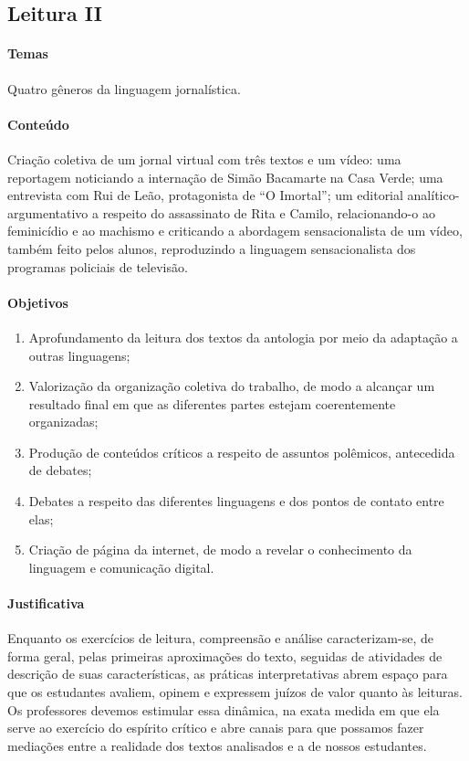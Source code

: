 \documentclass{extarticle}
\begin{document}
\subsection{Leitura II}


\paragraph{Temas} Quatro gêneros da linguagem jornalística.

\paragraph{Conteúdo} Criação coletiva de um jornal virtual com três textos
e um vídeo: uma reportagem noticiando a internação de Simão Bacamarte na
Casa Verde; uma entrevista com Rui de Leão, protagonista de ``O
Imortal''; um editorial analítico-argumentativo a respeito do
assassinato de Rita e Camilo, relacionando-o ao feminicídio e ao
machismo e criticando a abordagem sensacionalista de um vídeo, também
feito pelos alunos, reproduzindo a linguagem sensacionalista dos
programas policiais de televisão.

\paragraph{Objetivos}
\begin{enumerate}
\item Aprofundamento da leitura dos textos da antologia
por meio da adaptação a outras linguagens; 
\item Valorização da organização
coletiva do trabalho, de modo a alcançar um resultado final em que as
diferentes partes estejam coerentemente organizadas; 
\item Produção de
conteúdos críticos a respeito de assuntos polêmicos, antecedida de
debates; 
\item Debates a respeito das diferentes linguagens e dos pontos de
contato entre elas; 
\item Criação de página da internet, de modo a revelar
o conhecimento da linguagem e comunicação digital.
\end{enumerate}

\paragraph{Justificativa} Enquanto os exercícios de leitura, compreensão e
análise caracterizam-se, de forma geral, pelas primeiras aproximações do
texto, seguidas de atividades de descrição de suas características, as
práticas interpretativas abrem espaço para que os estudantes avaliem,
opinem e expressem juízos de valor quanto às leituras. Os professores
devemos estimular essa dinâmica, na exata medida em que ela serve ao
exercício do espírito crítico e abre canais para que possamos fazer
mediações entre a realidade dos textos analisados e a de nossos
estudantes.
\end{document}
